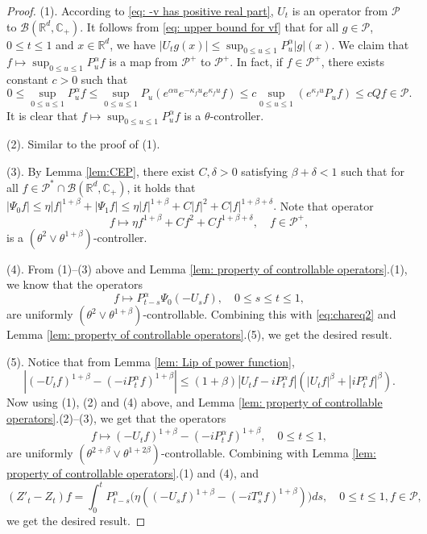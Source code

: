 \documentclass[12pt,a4paper]{amsart}
\theoremstyle{plain}
\theoremstyle{definition}
\numberwithin{equation}{section}
\begin{document}
\begin{proof}
  (1). According to \eqref{eq: -v has positive real part}, $U_t$ is an operator from $\mathcal P$ to $\mathcal B(\mathbb R^d, \mathbb C_+)$.
  It follows from \eqref{eq: upper bound for vf} that for all $g\in \mathcal P$, $0\leq t\leq 1$ and $x\in \mathbb R^d$, we have $ |U_t g(x)| \leq \sup_{0\leq u\leq 1}P_u^\alpha |g| (x). $
  We claim that $f\mapsto\sup_{0\leq u\leq 1}P^{\alpha}_u f$ is a map from $\mathcal P^+$ to $\mathcal P^+$. In fact, if $f\in \mathcal P^+$, there exists constant $c>0$ such that
  \[
    0
    \leq \sup_{0\leq u\leq 1}P^{\alpha}_u f
    \leq \sup_{0\leq u\leq 1} P_u (e^{\alpha u} e^{-\kappa_f u} e^{\kappa_f u} f )
    \leq c \sup_{0\leq u\leq 1} (e^{\kappa_fu}P_u f) \leq c Qf \in \mathcal P.
  \]
	It is clear that $f\mapsto\sup_{0\leq u\leq 1}P^{\alpha}_u f$ is a $\theta$-controller.

  (2). Similar to the proof of (1).

  (3). By Lemma \ref{lem:CEP}, there exist $C, \delta >0$ satisfying $\beta+\delta< 1$ such that for all $ f \in \mathcal P^* \cap \mathcal B( \mathbb R^d, \mathbb C_+ )$, it holds that $ |\Psi_0 f| \leq \eta |f|^{1+\beta} + |\Psi_1 f| \leq \eta |f|^{1+\beta} + C|f|^2+ C |f|^{1+\beta + \delta}.$
  Note that operator
  \[
    f \mapsto \eta f^{1+\beta} + Cf^2+ Cf^{1+\beta + \delta}
    , \quad f\in \mathcal P^+,
  \]
  is a $(\theta^2 \vee \theta^{1+\beta})$-controller.

  (4). From (1)--(3) above and Lemma \ref{lem: property of controllable operators}.(1), we know that the operators
  \[
    f \mapsto P^\alpha_{t-s}\Psi_0(-U_sf)
    , \quad 0\leq s\leq t\leq 1,
  \]
  are uniformly $(\theta^2\vee \theta^{1+\beta})$-controllable.
  Combining this with \eqref{eq:chareq2} and
  Lemma \ref{lem: property of controllable operators}.(5), we get the desired result.

  (5). Notice that from Lemma \ref{lem: Lip of power function},
  \[
    |(-U_t f)^{1+\beta} - (-iP^\alpha_t f)^{1+\beta} |
    \leq  (1+\beta) |U_t f-iP^\alpha_t f|(|U_t f|^{\beta}+|i P^\alpha_t f|^{\beta}).
  \]
  Now using (1), (2) and (4) above, and Lemma \ref{lem: property of controllable operators}.(2)--(3), we get that the operators
  \[
    f \mapsto (-U_t f)^{1+\beta} - (-iP^\alpha_t f)^{1+\beta},\quad 0\leq t\leq 1,
  \]
  are uniformly $(\theta^{2+\beta}\vee \theta^{1+2\beta})$-controllable.
  Combining with Lemma \ref{lem: property of controllable operators}.(1) and (4), and
  \[
    (Z'_t - Z_t)f
    = \int_0^t P^\alpha_{t-s}\Big( \eta ((-U_s f)^{1+\beta} - (-iT_s^\alpha f)^{1+\beta} )\Big)ds
    , \quad 0\leq t\leq 1, f\in \mathcal P,
  \]
  we get the desired result.


\end{proof}
\end{document}
